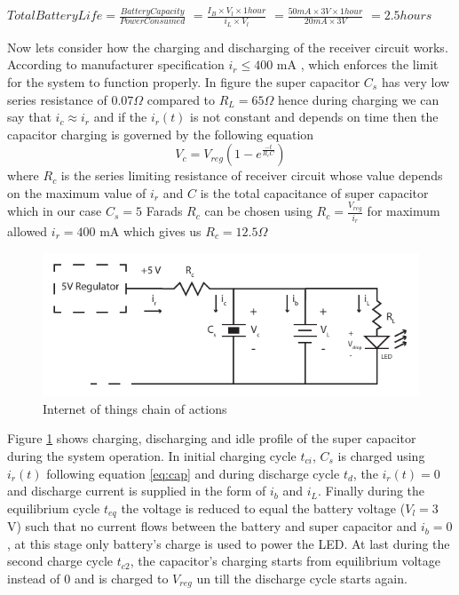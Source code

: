  $Total Battery Life = \frac{Battery Capacity}{Power Consumed}$
                    $= \frac{I_B \times V_l \times 1 hour}{i_L \times V_l}$
                    $= \frac{50mA \times 3V \times 1 hour}{20mA \times 3V}$
                    $= 2.5 hours$


Now lets consider how the charging and discharging of the receiver circuit works. According to manufacturer specification $i_r \leq 400 $ mA , which enforces the limit for the system to function properly.
In figure %
the super capacitor $C_s$ has very low series resistance of $0.07 \Omega$ compared to $R_L = 65 \Omega$ hence during charging we can say that $i_c \approx i_r$ and if the $i_r(t)$ is not constant and depends on time then the capacitor charging is governed by the following equation
\begin{equation}\label{eq:cap}
 V_c = V_{reg} \left(1 - e^{\frac{-t}{R_cC}}\right)
\end{equation}
where $R_c$ is the series limiting resistance of receiver circuit whose value depends on the maximum value of $i_r$ and $C$ is the total capacitance of super capacitor which in our case $C_s = 5 $ Farads
$R_c$ can be chosen using $R_c = \frac { V_{reg}}{i_r} $ for maximum allowed $i_r = 400$ mA which gives us $R_c = 12.5 \Omega$

\begin{figure}[h!]
\centering
\includegraphics[width=1\textwidth]{rec_design.pdf}
\caption{Internet of things chain of actions}
\label{fig:ch_profile}
\end{figure}


Figure \ref{fig:ch_profile}
shows charging, discharging and idle profile of the super capacitor during the system operation. In initial charging cycle $t_{ci}$, $C_s$ is charged using $i_r(t)$ following equation \ref{eq:cap} and during discharge cycle $t_d$, the $i_r(t) = 0$ and discharge current is supplied in the form of $i_b$ and $i_L$. Finally during the equilibrium cycle $t_{eq}$ the voltage is reduced to equal the battery voltage ($V_l = 3$ V) such that no current flows between the battery and super capacitor and $i_b = 0$, at this stage only battery's charge is used to power the LED. At last during the second charge cycle $t_{c2}$, the capacitor's charging starts from equilibrium voltage instead of 0 and is charged to $V_{reg}$ un till the discharge cycle starts again.





